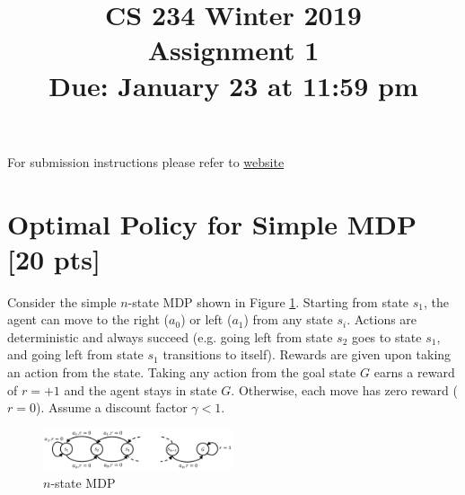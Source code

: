 \documentclass[11pt]{article}
\title{CS 234 Winter 2019 \\ Assignment 1 \\ Due: January 23 at 11:59 pm}
\date{}
\begin{document}
	\maketitle
\noindent For submission instructions please refer to \href{http://web.stanford.edu/class/cs234/assignments.html}{website}

\section{Optimal Policy for Simple MDP [20 pts]}

Consider the simple $n$-state MDP shown in Figure \ref{fig:Q1}. Starting from state $s_1$, the agent can move to the right ($a_0$) or left ($a_1$) from any state $s_i$. Actions are deterministic and always succeed (e.g. going left from
state $s_2$ goes to state $s_1$, and going left from state $s_1$ transitions to itself). Rewards are given upon taking an action from the state. Taking any action from the goal state $G$ earns a reward of $r=+1$
and the agent stays in state $G$. Otherwise, each move has zero reward ($r=0$). Assume a discount factor $\gamma < 1$.

\begin{figure}[h]
  \centering
    \includegraphics[width=0.5\textwidth]{Q1.pdf}
    \caption{$n$-state MDP}
  	\label{fig:Q1}
\end{figure}
\end{document}
